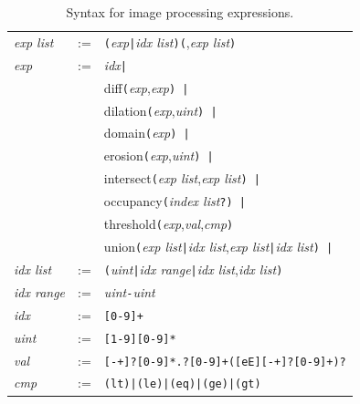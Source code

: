 \documentclass[11pt]{article}
\begin{document}
\begin{table}
\centering
\begin{tabular}{|lcl|}
\hline
\emph{exp list}    	&:=& \verb=(=\emph{exp}\verb=|=\emph{idx list}\verb=)(=,\emph{exp list}\verb=)= \\
\emph{exp}         	&:=& \emph{idx}\verb=|= \\
	    &  & diff\verb=(=\emph{exp},\emph{exp}\verb=) |= \\
	    &  & dilation\verb=(=\emph{exp},\emph{uint}\verb=) |= \\
	    &  & domain\verb=(=\emph{exp}\verb=) |= \\
	    &  & erosion\verb=(=\emph{exp},\emph{uint}\verb=) |= \\
	    &  & intersect\verb=(=\emph{exp list},\emph{exp list}\verb=) |= \\
	    &  & occupancy\verb=(=\emph{index list}\verb=?) |= \\
	    &  & threshold\verb=(=\emph{exp},\emph{val},\emph{cmp}\verb=)= \\
	    &  & union\verb=(=\emph{exp list}\verb=|=\emph{idx list},\emph{exp list}\verb=|=\emph{idx list}\verb=) |= \\
\emph{idx list}    	&:=& \verb=(=\emph{uint}\verb=|=\emph{idx range}\verb=|=\emph{idx list},\emph{idx list}\verb=)= \\
\emph{idx range}    	&:=& \emph{uint}\verb=-=\emph{uint} \\
\emph{idx}         	&:=& \verb=[0-9]+= \\
\emph{uint}         	&:=& \verb=[1-9][0-9]*= \\
\emph{val}         	&:=& \verb=[-+]?[0-9]*.?[0-9]+([eE][-+]?[0-9]+)?= \\
\emph{cmp}         	&:=& \verb=(lt)|(le)|(eq)|(ge)|(gt)= \\
\hline
\end{tabular}
\caption{Syntax for image processing expressions.}
\label{tbl:imgpsyntax}
\end{table}
\end{document}
